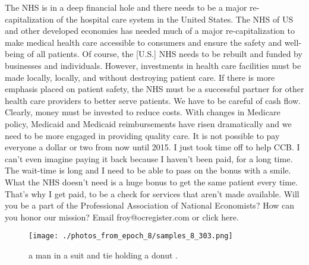 \documentclass{article}%
\begin{document}
The NHS is in a deep financial hole and there needs to be a major re{-}capitalization of the hospital care system in the United States. The NHS of US and other developed economies has needed much of a major re{-}capitalization to make medical health care accessible to consumers and ensure the safety and well{-}being of all patients. Of course, the {[}U.S.{]} NHS needs to be rebuilt and funded by businesses and individuals. However, investments in health care facilities must be made locally, locally, and without destroying patient care. If there is more emphasis placed on patient safety, the NHS must be a successful partner for other health care providers to better serve patients.\newline%
We have to be careful of cash flow. Clearly, money must be invested to reduce costs. With changes in Medicare policy, Medicaid and Medicaid reimbursements have risen dramatically and we need to be more engaged in providing quality care.\newline%
It is not possible to pay everyone a dollar or two from now until 2015. I just took time off to help CCB.\newline%
I can't even imagine paying it back because I haven't been paid, for a long time. The wait{-}time is long and I need to be able to pass on the bonus with a smile. What the NHS doesn't need is a huge bonus to get the same patient every time. That's why I get paid, to be a check for services that aren't made available.\newline%
Will you be a part of the Professional Association of National Economists? How can you honor our mission? Email froy@ocregister.com or click here.\newline%

%


\begin{figure}[h!]%
\centering%
\texttt{[image: ./photos\_from\_epoch\_8/samples\_8\_303.png]}%
\caption{a man in a suit and tie holding a donut .}%
\end{figure}

%
\end{document}
